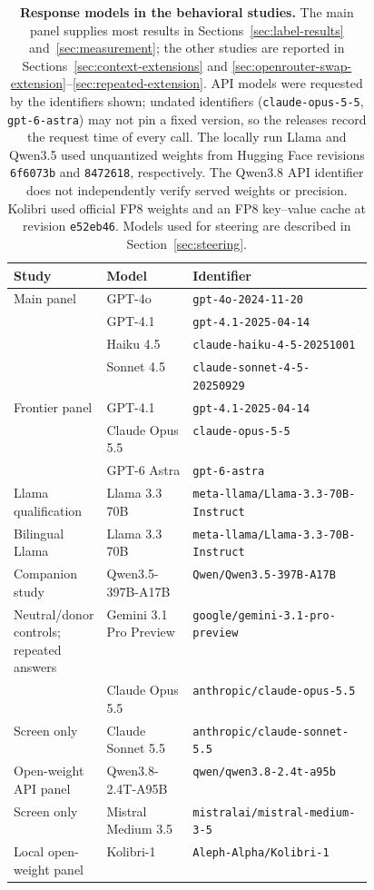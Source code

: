 \documentclass[11pt]{article}
\begin{document}
\begin{table}[!htb]
\centering\small
\caption{\textbf{Response models in the behavioral studies.} The main panel
supplies most results in Sections~\ref{sec:label-results}
and~\ref{sec:measurement}; the other studies are reported in
Sections~\ref{sec:context-extensions} and
\ref{sec:openrouter-swap-extension}--\ref{sec:repeated-extension}.
API models were requested by the identifiers shown; undated identifiers
(\texttt{claude-opus-5-5}, \texttt{gpt-6-astra}) may not pin a fixed version,
so the releases record the request time of every call. The locally run Llama
and Qwen3.5 used unquantized weights from Hugging Face revisions
\texttt{6f6073b} and \texttt{8472618}, respectively. The Qwen3.8 API identifier
does not independently verify served weights or precision. Kolibri used
official FP8 weights and an FP8 key--value cache at revision
\texttt{e52eb46}. Models used for steering are described in
Section~\ref{sec:steering}.}
\label{tab:models}
\begin{tabularx}{\linewidth}{@{}p{0.22\linewidth}p{0.24\linewidth}X@{}}
\toprule
Study & Model & Identifier\\
\midrule
Main panel & GPT-4o & \texttt{gpt-4o-2024-11-20}\\
 & GPT-4.1 & \texttt{gpt-4.1-2025-04-14}\\
 & Haiku 4.5 & \texttt{claude-haiku-4-5-20251001}\\
 & Sonnet 4.5 & \texttt{claude-sonnet-4-5-20250929}\\
\addlinespace
Frontier panel & GPT-4.1 & \texttt{gpt-4.1-2025-04-14}\\
 & Claude Opus 5.5 & \texttt{claude-opus-5-5}\\
 & GPT-6 Astra & \texttt{gpt-6-astra}\\
\addlinespace
Llama qualification & Llama 3.3 70B & \texttt{meta-llama/Llama-3.3-70B-Instruct}\\
Bilingual Llama & Llama 3.3 70B & \texttt{meta-llama/Llama-3.3-70B-Instruct}\\
\addlinespace
Companion study & Qwen3.5-397B-A17B & \texttt{Qwen/Qwen3.5-397B-A17B}\\
\addlinespace
Neutral/donor controls; repeated answers & Gemini 3.1 Pro Preview & \texttt{google/gemini-3.1-pro-preview}\\
 & Claude Opus 5.5 & \texttt{anthropic/claude-opus-5.5}\\
Screen only & Claude Sonnet 5.5 & \texttt{anthropic/claude-sonnet-5.5}\\
\addlinespace
Open-weight API panel & Qwen3.8-2.4T-A95B & \texttt{qwen/qwen3.8-2.4t-a95b}\\
Screen only & Mistral Medium 3.5 & \texttt{mistralai/mistral-medium-3-5}\\
Local open-weight panel & Kolibri-1 & \texttt{Aleph-Alpha/Kolibri-1}\\
\bottomrule
\end{tabularx}
\end{table}
\end{document}
